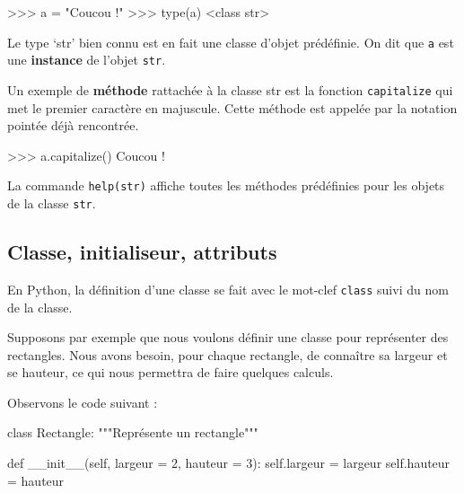 \documentclass[
  a4paper,
  DIV=11,
  numbers=noendperiod]{scrartcl}
\newenvironment{Shaded}{\begin{snugshade}}{\end{snugshade}}
\newcommand{\BuiltInTok}[1]{\textcolor[rgb]{0.00,0.23,0.31}{#1}}
\newcommand{\CommentTok}[1]{\textcolor[rgb]{0.37,0.37,0.37}{#1}}
\newcommand{\DecValTok}[1]{\textcolor[rgb]{0.68,0.00,0.00}{#1}}
\newcommand{\FunctionTok}[1]{\textcolor[rgb]{0.28,0.35,0.67}{#1}}
\newcommand{\KeywordTok}[1]{\textcolor[rgb]{0.00,0.23,0.31}{#1}}
\newcommand{\NormalTok}[1]{\textcolor[rgb]{0.00,0.23,0.31}{#1}}
\newcommand{\OperatorTok}[1]{\textcolor[rgb]{0.37,0.37,0.37}{#1}}
\newcommand{\StringTok}[1]{\textcolor[rgb]{0.13,0.47,0.30}{#1}}
\newcommand{\VariableTok}[1]{\textcolor[rgb]{0.07,0.07,0.07}{#1}}
\begin{document}
\begin{Shaded}
\begin{Highlighting}[]
\OperatorTok{\textgreater{}\textgreater{}\textgreater{}}\NormalTok{ a }\OperatorTok{=} \StringTok{"Coucou !"}
\OperatorTok{\textgreater{}\textgreater{}\textgreater{}} \BuiltInTok{type}\NormalTok{(a)}
\OperatorTok{\textless{}}\KeywordTok{class} \StringTok{\textquotesingle{}str\textquotesingle{}}\OperatorTok{\textgreater{}}
\end{Highlighting}
\end{Shaded}

Le type `str' bien connu est en fait une classe d'objet prédéfinie. On
dit que \texttt{a} est une \textbf{instance} de l'objet \texttt{str}.

Un exemple de \textbf{méthode} rattachée à la classe str est la fonction
\texttt{capitalize} qui met le premier caractère en majuscule. Cette
méthode est appelée par la notation pointée déjà rencontrée.

\begin{Shaded}
\begin{Highlighting}[]
\OperatorTok{\textgreater{}\textgreater{}\textgreater{}}\NormalTok{ a.capitalize()}
\CommentTok{\textquotesingle{}Coucou !\textquotesingle{}}
\end{Highlighting}
\end{Shaded}

La commande \texttt{help(str)} affiche toutes les méthodes prédéfinies
pour les objets de la classe \texttt{str}.

\hypertarget{classe-initialiseur-attributs}{%
\subsection{Classe, initialiseur,
attributs}\label{classe-initialiseur-attributs}}

En Python, la définition d'une classe se fait avec le mot-clef
\texttt{class} suivi du nom de la classe.

Supposons par exemple que nous voulons définir une classe pour
représenter des rectangles. Nous avons besoin, pour chaque rectangle, de
connaître sa largeur et se hauteur, ce qui nous permettra de faire
quelques calculs.

Observons le code suivant :

\begin{Shaded}
\begin{Highlighting}[]
\KeywordTok{class}\NormalTok{ Rectangle:}
    \CommentTok{"""Représente un rectangle"""}
    
    \KeywordTok{def} \FunctionTok{\_\_init\_\_}\NormalTok{(}\VariableTok{self}\NormalTok{, largeur }\OperatorTok{=} \DecValTok{2}\NormalTok{, hauteur }\OperatorTok{=} \DecValTok{3}\NormalTok{):}
        \VariableTok{self}\NormalTok{.largeur }\OperatorTok{=}\NormalTok{ largeur}
        \VariableTok{self}\NormalTok{.hauteur }\OperatorTok{=}\NormalTok{ hauteur}
\end{Highlighting}
\end{Shaded}
\end{document}
